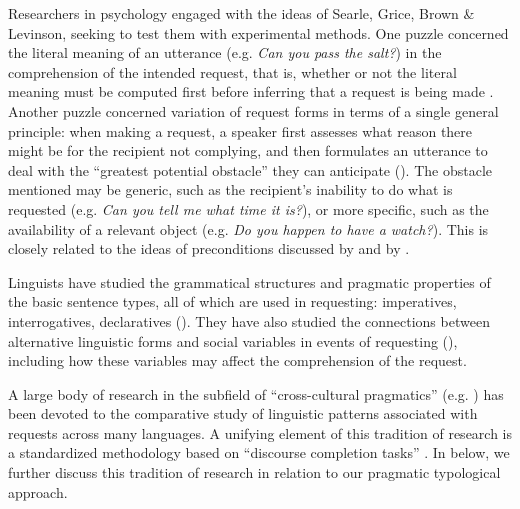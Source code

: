 \documentclass[output=paper,modfonts,nonflat]{langsci/langscibook}
\begin{document}
Researchers in psychology engaged with the ideas of Searle, Grice, Brown \& Levinson, seeking to test them with experimental methods. One puzzle concerned the literal meaning of an utterance (e.g. \textit{Can you pass the salt?}) in the comprehension of the intended request, that is, whether or not the literal meaning must be computed first before inferring that a request is being made \citep{ClarkLucy1975,Clark1979,Gibbs1979,ClarkSchunk1980,Gibbs1983,Gibbs1986a}. Another puzzle concerned variation of request forms in terms of a single general principle: when making a request, a speaker first assesses what reason there might be for the recipient not complying, and then formulates an utterance to deal with the “greatest potential obstacle” they can anticipate (\citealt{Gibbs1985,FrancikClark1985,Gibbs1986b,GibbsMüller1988,Clark1996}). The obstacle mentioned may be generic, such as the recipient’s inability to do what is requested (e.g. \textit{Can you tell me what time it is?}), or more specific, such as the availability of a relevant object (e.g. \textit{Do you happen to have a watch?}). This is closely related to the ideas of preconditions discussed by \citet{Searle1969} and by \citet{GordonLakoff1971}.

Linguists have studied the grammatical structures and pragmatic properties of the basic sentence types, all of which are used in requesting: imperatives, interrogatives, declaratives (\citealt{GordonLakoff1971,SadockZwicky1985,AikhenvaldDixon2017}). They have also studied the connections between alternative linguistic forms and social variables in events of requesting (\citealt{SinclairCoulthard1975,Ervin-Tripp1976,Ervin-Tripp1981,GordonErvin-Tripp1984,Ervin-TrippEtAl1990}), including how these variables may affect the comprehension of the request.

A large body of research in the subfield of “cross-cultural pragmatics” (e.g. \citealt{Blum-KulkaEtAl1989}) has been devoted to the comparative study of linguistic patterns associated with requests across many languages. A unifying element of this tradition of research is a standardized methodology based on “discourse completion tasks” \citep{Blum-Kulka1982}. In  below, we further discuss this tradition of research in relation to our pragmatic typological approach.
\end{document}
